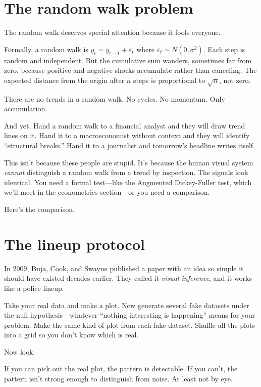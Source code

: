 \section{The random walk problem}

The random walk deserves special attention because it fools everyone.

Formally, a random walk is $y_t = y_{t-1} + \varepsilon_t$ where $\varepsilon_t \sim N(0, \sigma^2)$. Each step is random and independent. But the cumulative sum wanders, sometimes far from zero, because positive and negative shocks accumulate rather than canceling. The expected distance from the origin after $n$ steps is proportional to $\sqrt{n}$, not zero.

There are no trends in a random walk. No cycles. No momentum. Only accumulation.

And yet. Hand a random walk to a financial analyst and they will draw trend lines on it. Hand it to a macroeconomist without context and they will identify ``structural breaks.'' Hand it to a journalist and tomorrow's headline writes itself.

This isn't because these people are stupid. It's because the human visual system \emph{cannot} distinguish a random walk from a trend by inspection. The signals look identical. You need a formal test---like the Augmented Dickey-Fuller test, which we'll meet in the econometrics section---or you need a comparison.

Here's the comparison.

\section{The lineup protocol}

In 2009, Buja, Cook, and Swayne published a paper with an idea so simple it should have existed decades earlier. They called it \emph{visual inference}, and it works like a police lineup.

Take your real data and make a plot. Now generate several fake datasets under the null hypothesis---whatever ``nothing interesting is happening'' means for your problem. Make the same kind of plot from each fake dataset. Shuffle all the plots into a grid so you don't know which is real.

Now look.

If you can pick out the real plot, the pattern is detectable. If you can't, the pattern isn't strong enough to distinguish from noise. At least not by eye.

